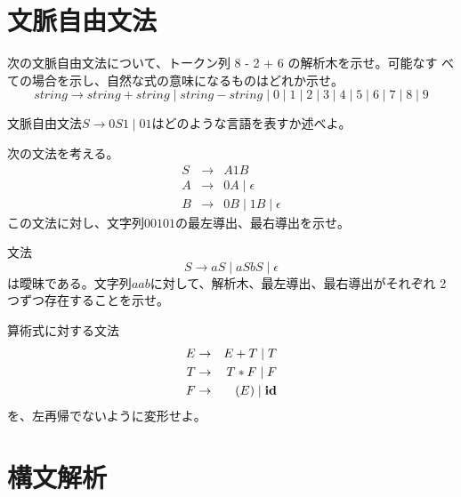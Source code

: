 \section{文脈自由文法}

\begin{exercise}
 次の文脈自由文法について、トークン列 8 - 2 + 6 の解析木を示せ。可能なす
 べての場合を示し、自然な式の意味になるものはどれか示せ。
 \[
  string \rightarrow string + string \mid string - string \mid 0 \mid 1
 \mid 2 \mid 3 \mid 4 \mid 5 \mid 6 \mid 7 \mid 8 \mid 9
 \]
\end{exercise}
\begin{exercise}
 文脈自由文法$S \rightarrow 0 S 1 \mid 0 1$はどのような言語を表すか述べよ。
\end{exercise}
\begin{exercise}
 次の文法を考える。
  \begin{eqnarray*}
   S & \rightarrow & A1B \\
   A & \rightarrow & 0A \mid \epsilon \\
   B & \rightarrow & 0B \mid 1B \mid \epsilon
  \end{eqnarray*}
 この文法に対し、文字列$00101$の最左導出、最右導出を示せ。
\end{exercise}
\begin{exercise}
 文法
 \begin{equation*}
  S \rightarrow aS \mid aSbS \mid \epsilon
 \end{equation*}
 は曖昧である。文字列$aab$に対して、解析木、最左導出、最右導出がそれぞれ
 2つずつ存在することを示せ。
\end{exercise}
\begin{exercise}
 算術式に対する文法
  \begin{eqnarray*}
   E & \rightarrow & E + T \mid T \\
   T & \rightarrow & T * F \mid F \\
   F & \rightarrow & (E) \mid {\bf id}
  \end{eqnarray*}
 を、左再帰でないように変形せよ。
\end{exercise}

\section{構文解析}

